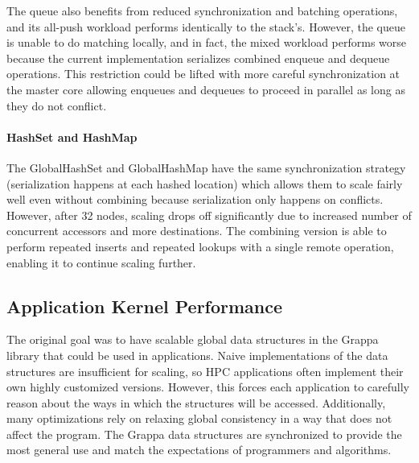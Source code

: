 The queue also benefits from reduced synchronization and batching operations, and its all-push workload performs identically to the stack's.
However, the queue is unable to do matching locally, and in fact, the mixed workload performs worse because the current implementation serializes combined enqueue and dequeue operations. This restriction could be lifted with more careful synchronization at the master core allowing enqueues and dequeues to proceed in parallel as long as they do not conflict.

\paragraph{HashSet and HashMap}
The GlobalHashSet and GlobalHashMap have the same synchronization strategy (serialization happens at each hashed location) which allows them to scale fairly well even without combining because serialization only happens on conflicts. However, after 32 nodes, scaling drops off significantly due to increased number of concurrent accessors and more destinations.
The combining version is able to perform repeated inserts and repeated lookups with a single remote operation, enabling it to continue scaling further.

\subsection{Application Kernel Performance}
The original goal was to have scalable global data structures in the Grappa library that could be used in applications. Naive implementations of the data structures are insufficient for scaling, so HPC applications often implement their own highly customized versions. However, this forces each application to carefully reason about the ways in which the structures will be accessed. Additionally, many optimizations rely on relaxing global consistency in a way that does not affect the program. 
The Grappa data structures are synchronized to provide the most general use and match the expectations of programmers and algorithms.

